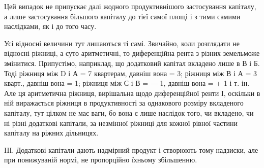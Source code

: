Цей випадок не припускає далі жодного продуктивнішого застосування
капіталу, а лише застосування більшого капіталу до тієї самої площі і з тими
самими наслідками, як і до того часу.

Усі відносні величини тут лишаються ті самі. Звичайно, коли розглядати
не відносні ріжниці, а суто аритметичні, то диференційна рента з різних земельможе
змінитися. Припустімо, наприклад, що додатковий капітал вкладено лише
в В і Б. Тоді ріжниця між D і А = 7 квартерам, давніш вона = 3; ріжниця
між В і А = 3 кварт., давніш вона = 1; ріжниця між С і В = — 1, давніш
вона = + 1 і т. ін. Але ця аритметична ріжниця, вирішальна щодо диференційної
ренти І, оскільки в ній виражається ріжниця в продуктивності за однакового
розміру вкладеного капіталу, тут цілком не має ваги, бо вона є лише
наслідок того, чи вкладено, чи ні різні додаткові капітали, за незмінної ріжниці
для кожної рівної частини капіталу на ріжних дільницях.

IIІ. Додаткові капітали дають надмірний продукт і створюють тому надзиски,
але при понижуваній нормі, не пропорційно їхньому збільшенню.

